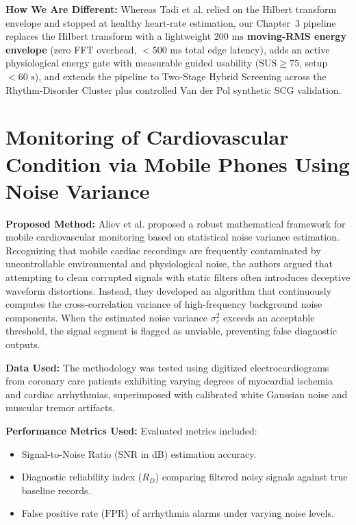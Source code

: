 \textbf{How We Are Different:} Whereas Tadi et al. relied on the Hilbert transform envelope and stopped at healthy heart-rate estimation, our Chapter~3 pipeline replaces the Hilbert transform with a lightweight \textbf{$200\text{ ms}$ moving-RMS energy envelope} (zero FFT overhead, $< 500\text{ ms}$ total edge latency), adds an active physiological energy gate with measurable guided usability ($\text{SUS} \ge 75$, setup $< 60\text{ s}$), and extends the pipeline to Two-Stage Hybrid Screening across the Rhythm-Disorder Cluster plus controlled Van der Pol synthetic SCG validation.

\newpage
\section{Monitoring of Cardiovascular Condition via Mobile Phones Using Noise Variance \cite{aliev2012monitoring}}

\textbf{Proposed Method:} Aliev et al. \cite{aliev2012monitoring} proposed a robust mathematical framework for mobile cardiovascular monitoring based on statistical noise variance estimation. Recognizing that mobile cardiac recordings are frequently contaminated by uncontrollable environmental and physiological noise, the authors argued that attempting to clean corrupted signals with static filters often introduces deceptive waveform distortions. Instead, they developed an algorithm that continuously computes the cross-correlation variance of high-frequency background noise components. When the estimated noise variance $\sigma_{\varepsilon}^2$ exceeds an acceptable threshold, the signal segment is flagged as unviable, preventing false diagnostic outputs.

\textbf{Data Used:} The methodology was tested using digitized electrocardiograms from coronary care patients exhibiting varying degrees of myocardial ischemia and cardiac arrhythmias, superimposed with calibrated white Gaussian noise and muscular tremor artifacts.

\textbf{Performance Metrics Used:} Evaluated metrics included:
\begin{itemize}
    \item Signal-to-Noise Ratio ($\text{SNR}$ in dB) estimation accuracy.
    \item Diagnostic reliability index ($R_D$) comparing filtered noisy signals against true baseline records.
    \item False positive rate ($\text{FPR}$) of arrhythmia alarms under varying noise levels.
\end{itemize}

